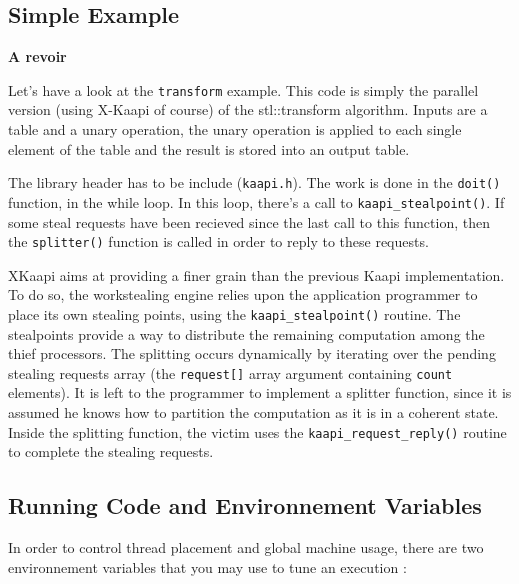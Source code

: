 \documentclass{article}
\newcommand{\kaapi}{\textsc{X}-Kaapi\xspace}
\begin{document}
\subsection{Simple Example}
\textbf{A revoir}
\begin{it}
Let's have a look at the \verb+transform+ example. This code is simply the parallel version (using \kaapi  of course) of the stl::transform
algorithm. Inputs are a table and a unary operation, the unary operation is applied to each single element of the table and the result is stored into an output table.

The library header has to be include (\verb+kaapi.h+). The work is done in the \verb+doit()+ function, in the while loop. In this loop, there's a call to \verb+kaapi_stealpoint()+. If some steal requests have been recieved since the last call to this function, then the \verb+splitter()+ function is called in order to reply to these requests.

XKaapi aims at providing a finer grain than the previous Kaapi implementation. To do so, the workstealing engine relies upon the application programmer to place its own stealing points, using the \verb+kaapi_stealpoint()+ routine. The stealpoints provide a way to distribute the remaining computation among the thief processors. The splitting occurs dynamically by iterating over the pending stealing requests array (the \verb+request[]+ array argument containing \verb+count+ elements). It is left to the programmer to implement a splitter function, since it is assumed he knows how to partition the computation as it is in a coherent state. Inside the splitting function, the victim uses the \verb+kaapi_request_reply()+ routine to complete the stealing requests.
\end{it}


\subsection{Running Code and Environnement Variables}

In order to control thread placement and global machine usage, there are two environnement variables that you may use to tune an execution :
\end{document}
